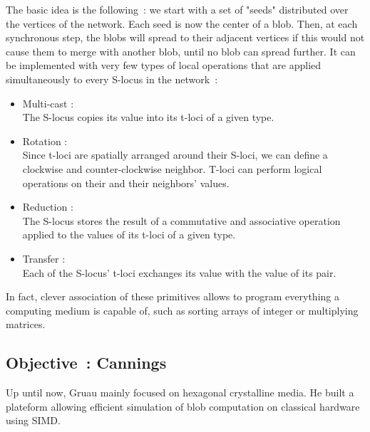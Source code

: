 \documentclass{article}
\begin{document}
The basic idea is the following~: we start with a set of "seeds" distributed over the vertices of the network. Each seed is now the center of a blob. Then, at each synchronous step, the blobs will spread to their adjacent vertices if this would not cause them to merge with another blob, until no blob can spread further. It can be implemented with very few types of local operations that are applied simultaneously to every S-locus in the network~:
\begin{itemize}
	\item Multi-cast :\\
	The S-locus copies its value into its t-loci of a given type.
	\item Rotation :\\
	Since t-loci are spatially arranged around their S-loci, we can define a clockwise and counter-clockwise neighbor. T-loci can perform logical operations on their and their neighbors' values.
	\item Reduction :\\
	The S-locus stores the result of a commutative and associative operation applied to the values of its t-loci of a given type.
	\item Transfer :\\
	Each of the S-locus' t-loci exchanges its value with the value of its pair. 
\end{itemize}
In fact, clever association of these primitives allows to program everything a computing medium is capable of, such as sorting arrays of integer or multiplying matrices\supercite{blob_computing2}.

\subsection{Objective~: Cannings}

Up until now, Gruau mainly focused on hexagonal crystalline media. He built a plateform allowing efficient simulation of blob computation on classical hardware using SIMD\supercite{Voronoi, platform_CA2}. 
\end{document}
